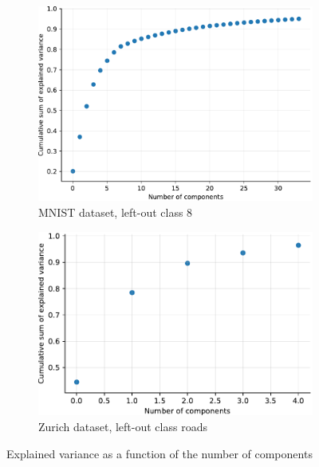 \documentclass[10pt]{article}
\begin{document}
\begin{figure}[H]
    \centering
    \begin{subfigure}{.45\textwidth}
        \centering
        \includegraphics[width=\textwidth]{MNIST_pca_components_wo_cl_8}
        \caption{\gls{MNIST} dataset, left-out class 8}
        \label{fig:pca_components_mnist}
    \end{subfigure}
    \begin{subfigure}{.45\textwidth}
        \centering
        \includegraphics[width=\textwidth]{ZH_pca_components_wo_cl_1}
        \caption{Zurich dataset, left-out class roads}
        \label{fig:pca_components_zurich}
    \end{subfigure}
    \caption{Explained variance as a function of the number of components}
    \label{fig:pca_components}
\end{figure}
\end{document}
